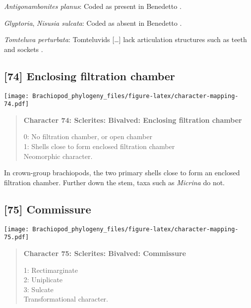 \documentclass[openany]{book}
\theoremstyle{definition}
\theoremstyle{definition}
\theoremstyle{definition}
\theoremstyle{remark}
\begin{document}
\hypertarget{Antigonambonites_planus-coding-73}{}
\emph{Antigonambonites planus}: Coded as present in Benedetto
\citeyearpar{Benedetto2009iChaniella}.

\hypertarget{Glyptoria-coding-73}{}
\emph{Glyptoria}, \emph{Nisusia sulcata}: Coded as absent in Benedetto
\citeyearpar{Benedetto2009iChaniella}.

\hypertarget{Tomteluva_perturbata-coding-73}{}
\emph{Tomteluva perturbata}: Tomteluvids {[}\ldots{}{]} lack
articulation structures such as teeth and sockets
\citep{Streng2016Anew}.

\subsection*{{[}74{]} Enclosing filtration
chamber}\label{enclosing-filtration-chamber}

\texttt{[image: Brachiopod\_phylogeny\_files/figure-latex/character-mapping-74.pdf]}

\begin{quote}
\textbf{Character 74: Sclerites: Bivalved: Enclosing filtration chamber}

0: No filtration chamber, or open chamber\\
1: Shells close to form enclosed filtration chamber\\
Neomorphic character.
\end{quote}

In crown-group brachiopods, the two primary shells close to form an
enclosed filtration chamber. Further down the stem, taxa such as
\emph{Micrina} do not.

\subsection*{{[}75{]} Commissure}\label{commissure}

\texttt{[image: Brachiopod\_phylogeny\_files/figure-latex/character-mapping-75.pdf]}

\begin{quote}
\textbf{Character 75: Sclerites: Bivalved: Commissure}

1: Rectimarginate\\
2: Uniplicate\\
3: Sulcate\\
Transformational character.
\end{quote}
\end{document}
